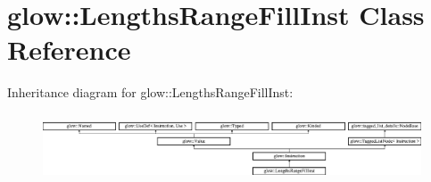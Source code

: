\hypertarget{classglow_1_1_lengths_range_fill_inst}{}\section{glow\+:\+:Lengths\+Range\+Fill\+Inst Class Reference}
\label{classglow_1_1_lengths_range_fill_inst}
Inheritance diagram for glow\+:\+:Lengths\+Range\+Fill\+Inst\+:\begin{figure}[H]
\begin{center}
\leavevmode
\includegraphics[height=1.991111cm]{classglow_1_1_lengths_range_fill_inst}
\end{center}
\end{figure}
